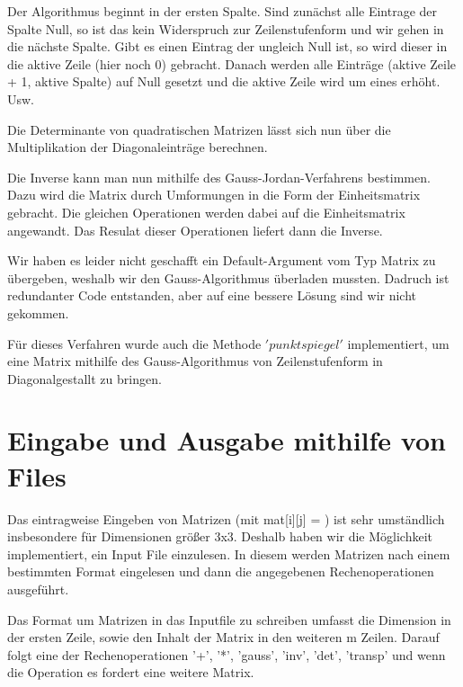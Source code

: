 \documentclass[a4paper]{article}
\begin{document}
\noindent
Der Algorithmus beginnt in der ersten Spalte. Sind zunächst alle Eintrage der Spalte Null, so ist das kein Widerspruch zur Zeilenstufenform und wir gehen in die nächste Spalte. Gibt es einen Eintrag der ungleich Null ist, so wird dieser in die aktive Zeile (hier noch 0) gebracht. Danach werden alle Einträge (aktive Zeile + 1, aktive Spalte) auf Null gesetzt und die aktive Zeile wird um eines erhöht. Usw. \newline

\noindent
Die Determinante von quadratischen Matrizen lässt sich nun über die Multiplikation der Diagonaleinträge berechnen. \newline

\noindent
Die Inverse kann man nun mithilfe des Gauss-Jordan-Verfahrens bestimmen. Dazu wird die Matrix durch Umformungen in die Form der Einheitsmatrix gebracht. Die gleichen Operationen werden dabei auf die Einheitsmatrix angewandt. Das Resulat dieser Operationen liefert dann die Inverse. 

\noindent
Wir haben es leider nicht geschafft ein Default-Argument vom Typ Matrix zu übergeben, weshalb wir den Gauss-Algorithmus überladen mussten. Dadruch ist redundanter Code entstanden, aber auf eine bessere Lösung sind wir nicht gekommen. 

\noindent
Für dieses Verfahren wurde auch die Methode $'punkt spiegel'$ implementiert, um eine Matrix mithilfe des Gauss-Algorithmus von Zeilenstufenform in Diagonalgestallt zu bringen.

\section*{Eingabe und Ausgabe mithilfe von Files}

Das eintragweise Eingeben von Matrizen (mit mat[i][j] = ) ist sehr umständlich insbesondere für Dimensionen größer 3x3. Deshalb haben wir die Möglichkeit implementiert, ein Input File einzulesen.
In diesem werden Matrizen nach einem bestimmten Format eingelesen und dann die  angegebenen Rechenoperationen ausgeführt. \newline

\noindent
Das Format um Matrizen in das Inputfile zu schreiben umfasst die Dimension in der ersten Zeile, sowie den Inhalt der Matrix in den weiteren m Zeilen. Darauf folgt eine der Rechenoperationen '+', '*', 'gauss', 'inv', 'det', 'transp' und wenn die Operation es fordert eine weitere Matrix.  \newline
\end{document}
